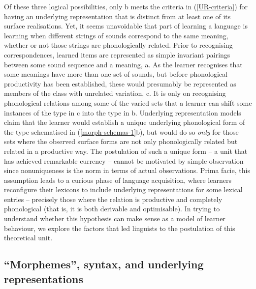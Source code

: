  
\largerpage[-2]
Of these three logical possibilities, only b meets the criteria in (\ref{UR-criteria}) for having an underlying representation that is distinct from at least one of its surface realisations. Yet, it seems unavoidable that part of learning a language is learning when different strings of sounds  correspond to the same meaning, whether or not those strings are phonologically related. Prior to recognising correspondences, learned items are represented as simple invariant pairings between some sound sequence and a meaning, a. As the learner recognises that some meanings have more than one set of sounds, but before phonological productivity has been established, these would presumably be represented as members of the class with unrelated variation, c. It is only on recognising phonological relations among some of the varied sets  that a learner can shift some instances of the type in c into the type in  b. Underlying representation models claim that  the learner would establish a unique underlying phonological form of the type schematised in (\ref{morph-schemas-1}b), but would do so {\it only} for those sets where the observed surface forms are not only phonologically related but related in a productive way. The postulation of such a unique form -- a unit that has achieved remarkable currency -- cannot be motivated by simple observation since nonuniqueness is the norm in terms of actual observations. Prima facie, this assumption leads to a curious phase of language acquisition, where learners reconfigure their lexicons to include underlying representations for some lexical entries -- precisely those where the relation is productive and completely phonological (that is, it is both derivable and optimisable). In trying to understand whether this hypothesis can make sense as a model of learner behaviour, we explore the  factors that led linguists to the postulation of this theoretical unit.


\largerpage[-2]
\subsection{``Morphemes'', syntax, and underlying representations}\label{historical-phoneme}


